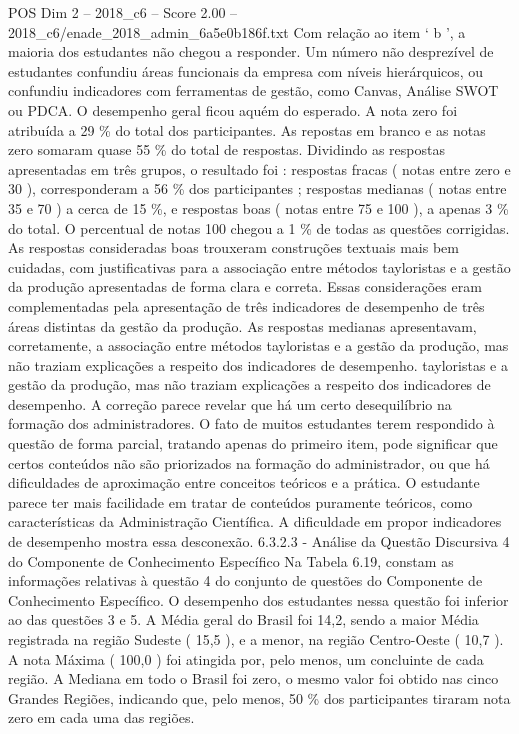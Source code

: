 \begin{textsample}{POS Dim 2 – 2018\_c6 – Score 2.00 – 2018\_c6/enade\_2018\_admin\_6a5e0b186f.txt}
Com relação ao item ‘ b ’, a maioria dos estudantes não chegou a responder.
Um número não desprezível de estudantes confundiu áreas funcionais da empresa com níveis hierárquicos, ou confundiu indicadores com ferramentas de gestão, como Canvas, Análise SWOT ou PDCA.
O desempenho geral ficou aquém do esperado.
A nota zero foi atribuída a 29 \% do total dos participantes.
As repostas em branco e as notas zero somaram quase 55 \% do total de respostas.
Dividindo as respostas apresentadas em três grupos, o resultado foi : respostas fracas ( notas entre zero e 30 ), corresponderam a 56 \% dos participantes ; respostas medianas ( notas entre 35 e 70 ) a cerca de 15 \%, e respostas boas ( notas entre 75 e 100 ), a apenas 3 \% do total.
O percentual de notas 100 chegou a 1 \% de todas as questões corrigidas.
As respostas consideradas boas trouxeram construções textuais mais bem cuidadas, com justificativas para a associação entre métodos tayloristas e a gestão da produção apresentadas de forma clara e correta.
Essas considerações eram complementadas pela apresentação de três indicadores de desempenho de três áreas distintas da gestão da produção.
As respostas medianas apresentavam, corretamente, a associação entre métodos tayloristas e a gestão da produção, mas não traziam explicações a respeito dos indicadores de desempenho. tayloristas e a gestão da produção, mas não traziam explicações a respeito dos indicadores de desempenho.
A correção parece revelar que há um certo desequilíbrio na formação dos administradores.
O fato de muitos estudantes terem respondido à questão de forma parcial, tratando apenas do primeiro item, pode significar que certos conteúdos não são priorizados na formação do administrador, ou que há dificuldades de aproximação entre conceitos teóricos e a prática.
O estudante parece ter mais facilidade em tratar de conteúdos puramente teóricos, como características da Administração Científica.
A dificuldade em propor indicadores de desempenho mostra essa desconexão. 6.3.2.3 - Análise da Questão Discursiva 4 do Componente de Conhecimento Específico Na Tabela 6.19, constam as informações relativas à questão 4 do conjunto de questões do Componente de Conhecimento Específico.
O desempenho dos estudantes nessa questão foi inferior ao das questões 3 e 5.
A Média geral do Brasil foi 14,2, sendo a maior Média registrada na região Sudeste ( 15,5 ), e a menor, na região Centro-Oeste ( 10,7 ).
A nota Máxima ( 100,0 ) foi atingida por, pelo menos, um concluinte de cada região.
A Mediana em todo o Brasil foi zero, o mesmo valor foi obtido nas cinco Grandes Regiões, indicando que, pelo menos, 50 \% dos participantes tiraram nota zero em cada uma das regiões.

\end{textsample}
